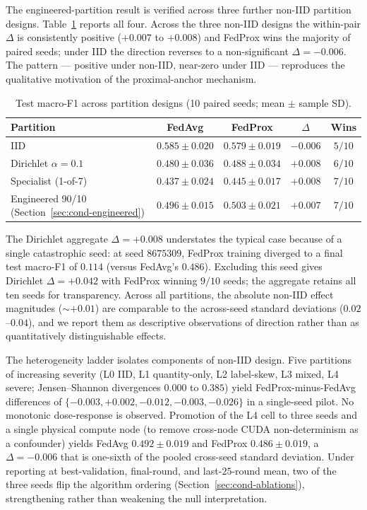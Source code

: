 \documentclass[11pt,a4paper]{report}
\begin{document}
The engineered-partition result is verified across three further
non-IID partition designs. Table~\ref{tab:cond-partition-robustness} reports
all four. Across the three non-IID designs the within-pair $\Delta$ is
consistently positive ($+0.007$ to $+0.008$) and FedProx wins the majority of
paired seeds; under IID the direction reverses to a non-significant
$\Delta = -0.006$. The pattern --- positive under non-IID, near-zero under
IID --- reproduces the qualitative motivation of the proximal-anchor
mechanism.

\begin{table}[!htbp]
\centering
\caption{Test macro-F1 across partition designs (10 paired seeds; mean
$\pm$ sample SD).}
\label{tab:cond-partition-robustness}
\small
\begin{tabular}{lcccc}
\toprule
Partition                       & FedAvg              & FedProx             & $\Delta$ & Wins   \\
\midrule
IID                              & $0.585 \pm 0.020$   & $0.579 \pm 0.019$   & $-0.006$ & $5/10$ \\
Dirichlet $\alpha = 0.1$         & $0.480 \pm 0.036$   & $0.488 \pm 0.034$   & $+0.008$ & $6/10$ \\
Specialist (1-of-7)              & $0.437 \pm 0.024$   & $0.445 \pm 0.017$   & $+0.008$ & $7/10$ \\
Engineered 90/10 (Section~\ref{sec:cond-engineered}) & $0.496 \pm 0.015$ & $0.503 \pm 0.021$ & $+0.007$ & $7/10$ \\
\bottomrule
\end{tabular}
\end{table}

The Dirichlet aggregate $\Delta = +0.008$ understates the typical case
because of a single catastrophic seed: at seed $8675309$, FedProx training
diverged to a final test macro-F1 of $0.114$ (versus FedAvg's $0.486$).
Excluding this seed gives Dirichlet $\Delta = +0.042$ with FedProx winning
$9/10$ seeds; the aggregate retains all ten seeds for transparency. Across
all partitions, the absolute non-IID effect magnitudes ($\sim +0.01$) are
comparable to the across-seed standard deviations ($0.02$--$0.04$), and we
report them as descriptive observations of direction rather than as
quantitatively distinguishable effects.

The heterogeneity ladder isolates components of non-IID design. Five
partitions of increasing severity (L0 IID, L1 quantity-only, L2 label-skew,
L3 mixed, L4 severe; Jensen--Shannon divergences $0.000$ to $0.385$) yield
FedProx-minus-FedAvg differences of $\{-0.003, +0.002, -0.012, -0.003,
-0.026\}$ in a single-seed pilot. No monotonic dose-response is observed.
Promotion of the L4 cell to three seeds and a single physical compute node
(to remove cross-node CUDA non-determinism as a confounder) yields FedAvg
$0.492 \pm 0.019$ and FedProx $0.486 \pm 0.019$, a $\Delta = -0.006$ that is
one-sixth of the pooled cross-seed standard deviation. Under reporting at
best-validation, final-round, and last-$25$-round mean, two of the three seeds
flip the algorithm ordering (Section~\ref{sec:cond-ablations}), strengthening
rather than weakening the null interpretation.
\end{document}
